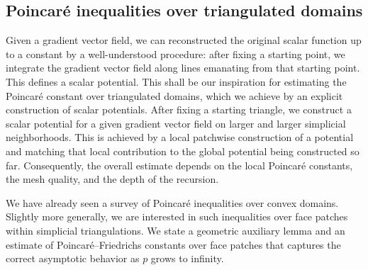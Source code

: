 \documentclass[a4paper]{article}
\begin{document}







\subsection{Poincar\'e inequalities over triangulated domains}

Given a gradient vector field, we can reconstructed the original scalar function up to a constant by a well-understood procedure: after fixing a starting point, we integrate the gradient vector field along lines emanating from that starting point. This defines a scalar potential. 
This shall be our inspiration for estimating the Poincar\'e constant over triangulated domains, which we achieve by an explicit construction of scalar potentials. 
After fixing a starting triangle, we construct a scalar potential for a given gradient vector field on larger and larger simplicial neighborhoods. This is achieved by a local patchwise construction of a potential and matching that local contribution to the global potential being constructed so far. 
Consequently, the overall estimate depends on the local Poincar\'e constants, the mesh quality, and the depth of the recursion. 


We have already seen a survey of Poincar\'e inequalities over convex domains. 
Slightly more generally, we are interested in such inequalities over face patches within simplicial triangulations. 
We state a geometric auxiliary lemma and an estimate of Poincar\'e--Friedrichs constants over face patches 
that captures the correct asymptotic behavior as $p$ grows to infinity.
\end{document}
